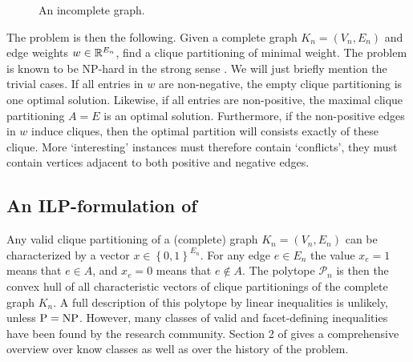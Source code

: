 \begin{figure}[h]
	\centering
	\caption{An incomplete graph.}
	\label{fig:incomplete_graph}
\end{figure}

The \CP problem is then the following.
Given a complete graph $K_n=(V_n,E_n)$ and edge weights $w \in \mathbb{R}^{E_n}$, find a clique partitioning of minimal weight.
The problem is known to be \textsc{NP}-hard in the strong sense \cite{wakabayashiAggregationBinaryRelations1986}.
We will just briefly mention the trivial cases.
If all entries in $w$ are non-negative, the empty clique partitioning is one optimal solution.
Likewise, if all entries are non-positive, the maximal clique partitioning $A = E$ is an optimal solution.
Furthermore, if the non-positive edges in $w$ induce cliques, then the optimal partition will consists exactly of these clique.
More ‘interesting’ instances must therefore contain ‘conflicts’, \ie they must contain vertices adjacent to both positive and negative edges.

\subsection{An ILP-formulation of \CP}\label{subsec:ilp_formulation}
Any valid clique partitioning of a (complete) graph $K_{n}=(V_{n}, E_{n})$ can be characterized by a vector $x \in \left\{ 0,1 \right\}^{E_{n}}$.
For any edge $e \in E_{n}$ the value $x_{e} = 1$ means that $e \in A$, and $x_{e} = 0$ means that $e \notin A$.
The \CP polytope $\mathscr{P}_{n}$ is then the convex hull of all characteristic vectors of clique partitionings of the complete graph $K_{n}$.
A full description of this polytope by linear inequalities is unlikely, unless $\mathit{\text{P}} = \mathit{\text{NP}}$.
However, many classes of valid and facet-defining inequalities have been found by the research community.
Section 2 of \cite{andresPolyhedralStudyLifted2022} gives a comprehensive overview over know classes as well as over the history of the problem.

